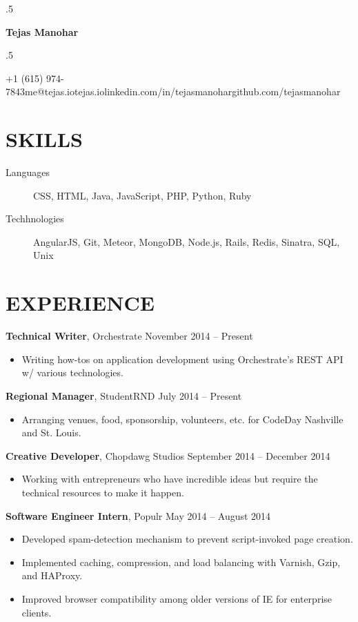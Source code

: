 \documentclass{res}
\newcommand*{\its}{\hspace{0.8cm}}
\begin{document}
\moveleft.5\hoffset\centerline{\Huge\bf Tejas Manohar}
\bigskip
\moveleft.5\hoffset\centerline{+1 (615) 974-7843\its{}me@tejas.io\its{}\its{}tejas.io\its{}linkedin.com/in/tejasmanohar\its{}github.com/tejasmanohar}

\section{SKILLS}

\begin{description}
  \item[Languages] CSS, HTML, Java, JavaScript, PHP, Python, Ruby
  \item[Techhnologies] AngularJS, Git, Meteor, MongoDB, Node.js, Rails, Redis, Sinatra, SQL, Unix
\end{description}

\section{EXPERIENCE}

{\bf Technical Writer}, Orchestrate \hfill November 2014 -- Present
\begin{itemize} \itemsep -2pt
  \item Writing how-tos on application development using Orchestrate's REST API w/ various technologies.
\end{itemize}

{\bf Regional Manager}, StudentRND \hfill July 2014 -- Present
\begin{itemize} \itemsep -2pt
  \item Arranging venues, food, sponsorship, volunteers, etc. for CodeDay Nashville and St. Louis.
\end{itemize}

{\bf Creative Developer}, Chopdawg Studios \hfill September 2014 -- December 2014
\begin{itemize} \itemsep -2pt
  \item Working with entrepreneurs who have incredible ideas but require the technical resources to make it happen.
\end{itemize}

{\bf Software Engineer Intern}, Populr \hfill May 2014 -- August 2014
\begin{itemize} \itemsep -2pt
  \item Developed spam-detection mechanism to prevent script-invoked page creation.
  \item Implemented caching, compression, and load balancing with Varnish, Gzip, and HAProxy.
  \item Improved browser compatibility among older versions of IE for enterprise clients.
\end{itemize}
\end{document}

